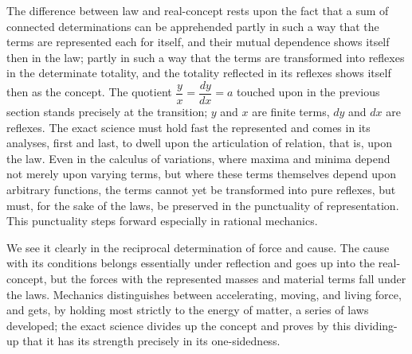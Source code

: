 \documentclass[12pt]{book}
\begin{document}
The difference between law and real-concept rests upon the fact that a sum of
connected determinations can be apprehended partly in such a way that the terms are
represented each for itself, and their mutual dependence shows itself then in the
law; partly in such a way that the terms are transformed into reflexes in the
determinate totality, and the totality reflected in its reflexes shows itself then
as the concept. The quotient $\dfrac{y}{x} = \dfrac{dy}{dx} = a$ touched upon in
the previous section stands precisely at the transition; $y$ and $x$ are finite
terms, $dy$ and $dx$ are reflexes. The exact science must hold fast the
represented and comes in its analyses, first and last, to dwell upon the
articulation of relation, that is, upon the law. Even in the calculus of
variations, where maxima and minima depend not merely upon varying terms, but where
these terms themselves depend upon arbitrary functions, the terms cannot yet be
transformed into pure reflexes, but must, for the sake of the laws, be preserved in
the punctuality of representation. This punctuality steps forward especially in
rational mechanics.

We see it clearly in the reciprocal determination of force and cause. The cause with
its conditions belongs essentially under reflection and goes up into the
real-concept, but the forces with the represented masses and material terms fall
under the laws. Mechanics distinguishes between accelerating, moving, and living
force, and gets, by holding most strictly to the energy of matter, a series of laws
developed; the exact science divides up the concept and proves by this dividing-up
that it has its strength precisely in its one-sidedness.
\end{document}

